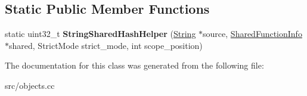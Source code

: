 \subsection*{Static Public Member Functions}
\begin{DoxyCompactItemize}
\item 
\hypertarget{classv8_1_1internal_1_1_string_shared_key_a4573d62c15eeb0a33a3141c051b01939}{}static uint32\+\_\+t {\bfseries String\+Shared\+Hash\+Helper} (\hyperlink{classv8_1_1internal_1_1_string}{String} $\ast$source, \hyperlink{classv8_1_1internal_1_1_shared_function_info}{Shared\+Function\+Info} $\ast$shared, Strict\+Mode strict\+\_\+mode, int scope\+\_\+position)\label{classv8_1_1internal_1_1_string_shared_key_a4573d62c15eeb0a33a3141c051b01939}

\end{DoxyCompactItemize}


The documentation for this class was generated from the following file\+:\begin{DoxyCompactItemize}
\item 
src/objects.\+cc\end{DoxyCompactItemize}
